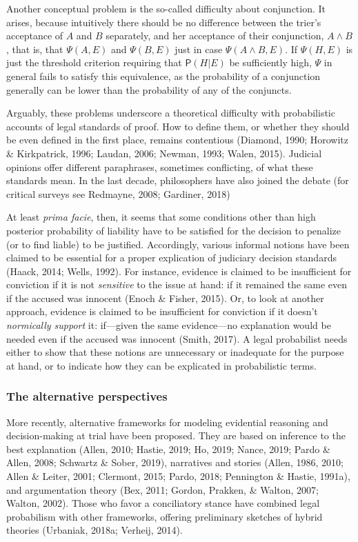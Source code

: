 \documentclass[11pt,dvipsnames,enabledeprecatedfontcommands]{scrartcl}
\newcommand{\pr}[1]{\mathsf{P}(#1)}
\begin{document}
Another conceptual problem is the so-called difficulty about
conjunction. It arises, because intuitively there should be no
difference between the trier's acceptance of \(A\) and \(B\) separately,
and her acceptance of their conjunction, \(A\wedge B\), that is, that
\(\Psi(A,E)\) and \(\Psi(B,E)\) just in case \(\Psi(A\wedge B, E)\). If
\(\Psi(H,E)\) is just the threshold criterion requiring that
\(\pr{H\vert E}\) be sufficiently high, \(\Psi\) in general fails to
satisfy this equivalence, as the probability of a conjunction generally
can be lower than the probability of any of the conjuncts.

Arguably, these problems underscore a theoretical difficulty with
probabilistic accounts of legal standards of proof. How to define them,
or whether they should be even defined in the first place, remains
contentious (Diamond, 1990; Horowitz \& Kirkpatrick, 1996; Laudan, 2006;
Newman, 1993; Walen, 2015). Judicial opinions offer different
paraphrases, sometimes conflicting, of what these standards mean. In the
last decade, philosophers have also joined the debate (for critical
surveys see Redmayne, 2008; Gardiner, 2018)

At least \emph{prima facie}, then, it seems that some conditions other
than high posterior probability of liability have to be satisfied for
the decision to penalize (or to find liable) to be justified.
Accordingly, various informal notions have been claimed to be essential
for a proper explication of judiciary decision standards (Haack, 2014;
Wells, 1992). For instance, evidence is claimed to be insufficient for
conviction if it is not \emph{sensitive} to the issue at hand: if it
remained the same even if the accused was innocent (Enoch \& Fisher,
2015). Or, to look at another approach, evidence is claimed to be
insufficient for conviction if it doesn't \emph{normically support} it:
if---given the same evidence---no explanation would be needed even if
the accused was innocent (Smith, 2017). A legal probabilist needs either
to show that these notions are unnecessary or inadequate for the purpose
at hand, or to indicate how they can be explicated in probabilistic
terms.

\hypertarget{the-alternative-perspectives}{%
\subsubsection{The alternative
perspectives}\label{the-alternative-perspectives}}

More recently, alternative frameworks for modeling evidential reasoning
and decision-making at trial have been proposed. They are based on
inference to the best explanation (Allen, 2010; Hastie, 2019; Ho, 2019;
Nance, 2019; Pardo \& Allen, 2008; Schwartz \& Sober, 2019), narratives
and stories (Allen, 1986, 2010; Allen \& Leiter, 2001; Clermont, 2015;
Pardo, 2018; Pennington \& Hastie, 1991a), and argumentation theory
(Bex, 2011; Gordon, Prakken, \& Walton, 2007; Walton, 2002). Those who
favor a conciliatory stance have combined legal probabilism with other
frameworks, offering preliminary sketches of hybrid theories (Urbaniak,
2018a; Verheij, 2014).
\end{document}
